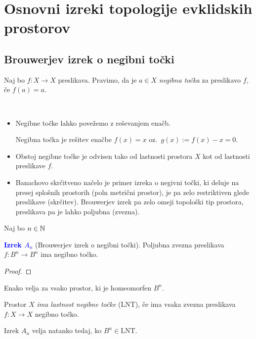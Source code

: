 \section{Osnovni izreki topologije evklidskih prostorov}
\subsection{Brouwerjev izrek o negibni točki}
\begin{definicija}
    Naj bo \(f: X \to X\) preslikava. Pravimo, da je \(a \in X\) \emph{negibna točka} za preslikavo \(f\), če \(f(a) = a\).
\end{definicija}

\begin{opomba}
    \ 
    \begin{itemize}
        \item Negibne točke lahko povežemo z reševanjem enačb. 
        
        Negibna točka je rešitev enačbe \(f(x)=  x\) oz.\ \(g(x) := f(x) - x = 0\).
        \item Obstoj negibne točke je odvisen tako od lastnosti prostora \(X\) kot od lastnosti preslikave \(f\).
        \item Banachovo skrčitveno načelo je primer izreka o negivni točki, ki deluje na presej splošnih prostorih (poln metrični prostor), je pa zelo restriktiven glede preslikave (skrčitev). Brouwerjev izrek pa zelo omeji topološki tip prostora, preslikava pa je lahko poljubna (zvezna).
    \end{itemize}
\end{opomba}

Naj bo \(n \in \mathbb{N}\)

\textcolor{blue}{\textbf{Izrek \(A_n\)}} (Brouwerjev izrek o negibni točki).
Poljubna zvezna preslikava \(f: B^n \to B^n\) ima negibno točko.

\begin{proof}
    \todo{}
\end{proof}

\begin{opomba}
    Enako velja za vsako prostor, ki je homeomorfen \(B^n\).
\end{opomba}

\begin{definicija}
    Prostor \(X\) \emph{ima lastnost negibne točke} (LNT), če ima vsaka zvezna preslikava \(f: X \to X\) negibno točko.
\end{definicija}

\begin{opomba}
    Izrek \(A_n\) velja natanko tedaj, ko \(B^n \in \text{LNT}\).
\end{opomba}

